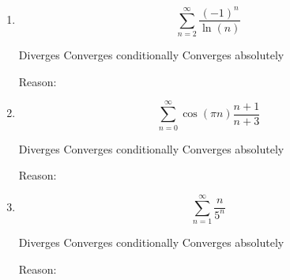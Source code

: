 \documentclass[12pt]{article}
\newcommand{\emptybox}[2][\textwidth]{%
	\begingroup
	\setlength{\fboxsep}{-\fboxrule}%
	\noindent\framebox[#1]{\rule{0pt}{#2}}%
	\endgroup
}
\theoremstyle{definition}
\theoremstyle{remark}
\begin{document}
\begin{enumerate}
	 \item 
	\begin{equation*}
		\sum\limits_{n=2}^\infty \frac{(-1)^n}{\ln(n)} 
	\end{equation*}

\begin{center}
	\raisebox{-.3\height}{\emptybox[.25in]{.25in}} Diverges \hspace{.5 in} \raisebox{-.3\height}{\emptybox[.25in]{.25in}} Converges conditionally \hspace{.5 in} \raisebox{-.3\height}{\emptybox[.25in]{.25in}} Converges absolutely
\end{center}  
Reason:
\vfill
\vfill
	

    \item 
    \begin{equation*}
        \sum\limits_{n=0}^\infty \cos(\pi n)\frac{n+1}{n+3} 
    \end{equation*}
\begin{center}
	\raisebox{-.3\height}{\emptybox[.25in]{.25in}} Diverges \hspace{.5 in} \raisebox{-.3\height}{\emptybox[.25in]{.25in}} Converges conditionally \hspace{.5 in} \raisebox{-.3\height}{\emptybox[.25in]{.25in}} Converges absolutely
\end{center}  
Reason:
\vfill
\vfill
\newpage
\vspace{.2in}
 \vspace{.2in}


     \item  \begin{equation*}
        \sum\limits_{n=1}^\infty \frac{n}{5^n}
    \end{equation*}
    \begin{center}
    	\raisebox{-.3\height}{\emptybox[.25in]{.25in}} Diverges \hspace{.5 in} \raisebox{-.3\height}{\emptybox[.25in]{.25in}} Converges conditionally \hspace{.5 in} \raisebox{-.3\height}{\emptybox[.25in]{.25in}} Converges absolutely
    \end{center}  
    Reason:
    \vfill
    \vfill
   

\end{enumerate}
\end{document}
